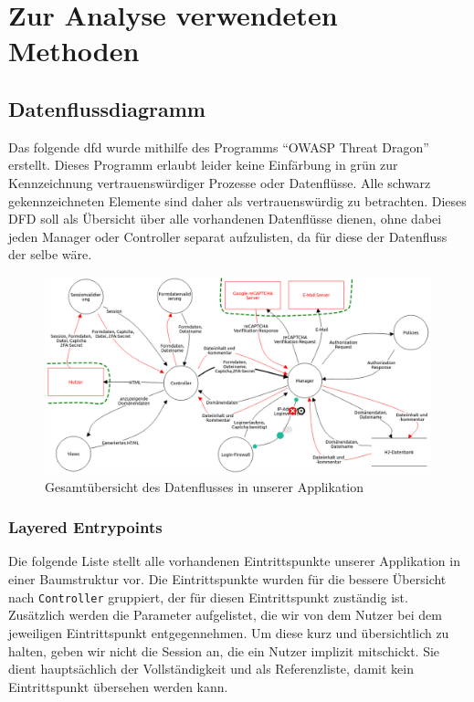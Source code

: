\documentclass[12pt,DIV14,BCOR10mm,a4paper,parskip=half-,headsepline,headinclude,english,ngerman,bibliography=totocnumbered]{scrreprt}
\begin{document}
\vspace*{-3cm}

\tableofcontents  %

\chapter{Zur Analyse verwendeten Methoden}
\section{Datenflussdiagramm}

Das folgende \gls{dfd} wurde mithilfe des Programms \enquote{OWASP Threat Dragon} \autocite{OWASP.ThreatDragon} erstellt.
Dieses Programm erlaubt leider keine Einfärbung in grün zur Kennzeichnung vertrauenswürdiger Prozesse oder Datenflüsse.
Alle schwarz gekennzeichneten Elemente sind daher als vertrauenswürdig zu betrachten.
Dieses DFD soll als Übersicht über alle vorhandenen Datenflüsse dienen, ohne dabei jeden Manager oder Controller separat aufzulisten, da für diese der Datenfluss der selbe wäre.

\begin{figure}[htbp]
  \hspace*{-2.5cm}
  \label{overview-dfd-pic}
  \includegraphics[width=1.25\linewidth]{resources/overview-dfd.jpg}
  \caption{Gesamtübersicht des Datenflusses in unserer Applikation}
\end{figure}

\subsection{Layered Entrypoints}

Die folgende Liste stellt alle vorhandenen Eintrittspunkte unserer Applikation in einer Baumstruktur vor.
Die Eintrittspunkte wurden für die bessere Übersicht nach \texttt{Controller} gruppiert, der für diesen Eintrittspunkt zuständig ist.
Zusätzlich werden die Parameter aufgelistet, die wir von dem Nutzer bei dem jeweiligen Eintrittspunkt entgegennehmen. Um diese kurz und übersichtlich zu halten, geben wir nicht die Session an, die ein Nutzer implizit mitschickt.
Sie dient hauptsächlich der Vollständigkeit und als Referenzliste, damit kein Eintrittspunkt übersehen werden kann.
\end{document}
